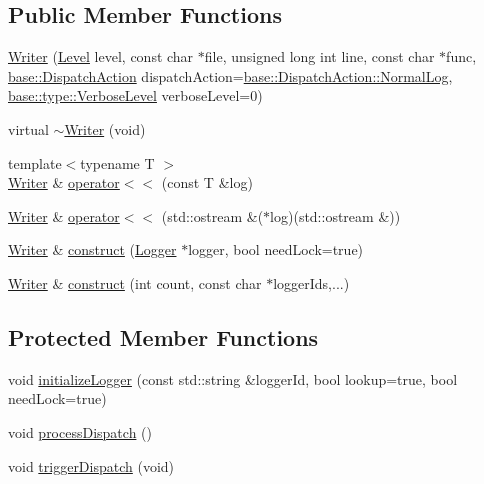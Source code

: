 \subsection*{Public Member Functions}
\begin{DoxyCompactItemize}
\item 
\hyperlink{classel_1_1base_1_1_writer_ac2a835925f37fd2ca3da00998d8a533c}{Writer} (\hyperlink{namespaceel_ab0ac6091262344c52dd2d3ad099e8e36}{Level} level, const char $\ast$file, unsigned long int line, const char $\ast$func, \hyperlink{namespaceel_1_1base_a3aa2563d38e47388ba242a1694fc2839}{base\+::\+Dispatch\+Action} dispatch\+Action=\hyperlink{namespaceel_1_1base_a3aa2563d38e47388ba242a1694fc2839a44d8ee68145a7d9849eeaa634c443602}{base\+::\+Dispatch\+Action\+::\+Normal\+Log}, \hyperlink{namespaceel_1_1base_1_1type_a3f79fa74639a13c32f794ba074fe7fb4}{base\+::type\+::\+Verbose\+Level} verbose\+Level=0)
\item 
virtual \hyperlink{classel_1_1base_1_1_writer_a6db9eafd05eed680d93c7f29b786a41d}{$\sim$\+Writer} (void)
\item 
{\footnotesize template$<$typename T $>$ }\\\hyperlink{classel_1_1base_1_1_writer}{Writer} \& \hyperlink{classel_1_1base_1_1_writer_ab94f0d920c6465a57937e893aa9f5ada}{operator$<$$<$} (const T \&log)
\item 
\hyperlink{classel_1_1base_1_1_writer}{Writer} \& \hyperlink{classel_1_1base_1_1_writer_aea6d7f996ff92e9485a76ad3955f0a29}{operator$<$$<$} (std\+::ostream \&($\ast$log)(std\+::ostream \&))
\item 
\hyperlink{classel_1_1base_1_1_writer}{Writer} \& \hyperlink{classel_1_1base_1_1_writer_a282d82f392a3e6fef9eda47ce53e87dc}{construct} (\hyperlink{classel_1_1_logger}{Logger} $\ast$logger, bool need\+Lock=true)
\item 
\hyperlink{classel_1_1base_1_1_writer}{Writer} \& \hyperlink{classel_1_1base_1_1_writer_ab2bc960787eb3c9b01569629dcbeb246}{construct} (int count, const char $\ast$logger\+Ids,...)
\end{DoxyCompactItemize}
\subsection*{Protected Member Functions}
\begin{DoxyCompactItemize}
\item 
void \hyperlink{classel_1_1base_1_1_writer_ae687ebbee62b086f318ee4c8d1a655c4}{initialize\+Logger} (const std\+::string \&logger\+Id, bool lookup=true, bool need\+Lock=true)
\item 
void \hyperlink{classel_1_1base_1_1_writer_a692d05d209840d6ae8c2c8e0bea21d29}{process\+Dispatch} ()
\item 
void \hyperlink{classel_1_1base_1_1_writer_a1c7d90bd4e00af4e7307f5936e1b6507}{trigger\+Dispatch} (void)
\end{DoxyCompactItemize}
